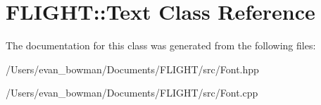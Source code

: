 \hypertarget{class_f_l_i_g_h_t_1_1_text}{}\section{F\+L\+I\+G\+HT\+:\+:Text Class Reference}
\label{class_f_l_i_g_h_t_1_1_text}


The documentation for this class was generated from the following files\+:\begin{DoxyCompactItemize}
\item 
/\+Users/evan\+\_\+bowman/\+Documents/\+F\+L\+I\+G\+H\+T/src/Font.\+hpp\item 
/\+Users/evan\+\_\+bowman/\+Documents/\+F\+L\+I\+G\+H\+T/src/Font.\+cpp\end{DoxyCompactItemize}

